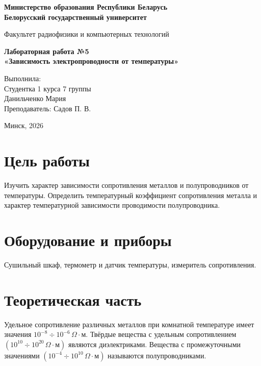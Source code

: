\documentclass[a4paper,14pt]{extarticle}
\begin{document}
\begin{titlepage}
\begin{center}
\textbf{Министерство образования Республики Беларусь}\\
\textbf{Белорусский государственный университет}

Факультет радиофизики и компьютерных технологий
\vspace{6cm}

\textbf{Лабораторная работа №5}\\
\textbf{«Зависимость электропроводности от температуры»}
\end{center}

\vfill
\begin{flushright}
Выполнила:\\
Студентка 1 курса 7 группы\\
Данильченко Мария\\
Преподаватель: Садов П. В.\\
\end{flushright}

\vfill
\begin{center}
Минск, 2026
\end{center}
\end{titlepage}

\section*{Цель работы}

Изучить характер зависимости сопротивления металлов и полупроводников от температуры. Определить температурный коэффициент сопротивления металла и характер температурной зависимости проводимости полупроводника.

\section*{Оборудование и приборы}

Сушильный шкаф, термометр и датчик температуры, измеритель сопротивления.

\section*{Теоретическая часть}

Удельное сопротивление различных металлов при комнатной температуре имеет значения
$10^{-8} \div 10^{-6}\,\Omega\cdot\text{м}$.
Твёрдые вещества с удельным сопротивлением
$(10^{10} \div 10^{20}\,\Omega\cdot\text{м})$
являются диэлектриками. Вещества с промежуточными значениями
$(10^{-4} \div 10^{10}\,\Omega\cdot\text{м})$
называются полупроводниками.
\end{document}
